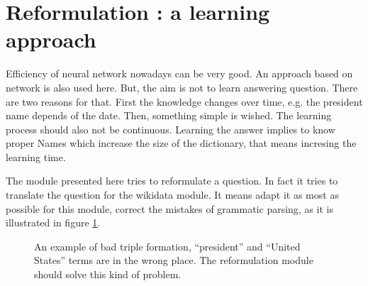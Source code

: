 \section{Reformulation : a learning approach }
\label{mlreformulation}

Efficiency of neural network nowadays can be very good. An approach based on network is also used here. But, the aim is not to learn answering question. There are two reasons for that. First the knowledge changes over time, e.g. the president name depends of the date. Then, something simple is wished. The learning process should also not be continuous. Learning the answer implies to know proper Names which increase the size of the dictionary, that means incresing the learning time. 

The module presented here tries to reformulate a question. In fact it tries to translate the question for the wikidata module. It means adapt it as most as possible for this module, correct the mistakes of grammatic parsing, as it is illustrated in figure \ref{figexmlrefref}.

\begin{figure}
\begin{center}
 \caption{An example of bad triple formation, ``president'' and ``United States'' terms are in the wrong place. The reformulation module should solve this kind of problem.}
\end{center}
\label{figexmlrefref}
\end{figure}

